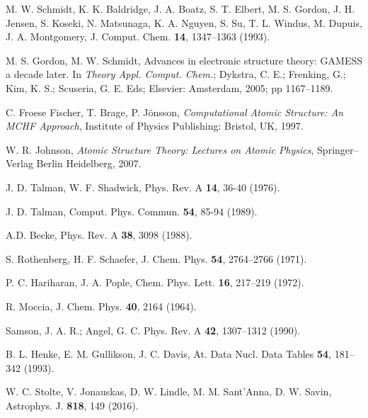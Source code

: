 \begin{thebibliography}{9}

M. W. Schmidt, K. K. Baldridge, J. A. Boatz, S. T. Elbert, M. S. Gordon, 
J. H. Jensen, S. Koseki, N. Matsunaga, K. A. Nguyen, S. Su, T. L. Windus, 
M. Dupuis, J. A. Montgomery, 
J. Comput. Chem. \textbf{14}, 1347--1363 (1993).

M. S. Gordon, M. W. Schmidt, 
Advances in electronic structure theory: GAMESS a decade later. 
In \textit{Theory Appl. Comput. Chem.}; 
Dykstra, C. E.; Frenking, G.; Kim, K. S.; Scuseria, G. E. Eds;
Elsevier: Amsterdam, 2005; pp 1167--1189.


C. Froese Fischer, T. Brage, P. J\"onsson,
\textit{Computational Atomic Structure: An MCHF Approach},
Institute of Physics Publishing: Bristol, UK, 1997.

W. R. Johnson, 
\textit{Atomic Structure Theory: Lectures on Atomic Physics},
Springer--Verlag Berlin Heidelberg, 2007.


J. D. Talman, W. F. Shadwick, 
Phys. Rev. A \textbf{14}, 36-40 (1976).

J. D. Talman, 
Comput. Phys. Commun. \textbf{54}, 85-94 (1989).


A.D. Becke, 
Phys. Rev. A \textbf{38}, 3098 (1988).


S. Rothenberg, H. F. Schaefer, 
J. Chem. Phys. \textbf{54}, 2764--2766 (1971).

P. C. Hariharan, J. A. Pople, 
Chem. Phys. Lett. \textbf{16}, 217--219 (1972).

R. Moccia, 
J. Chem. Phys. \textbf{40}, 2164 (1964).


Samson, J. A. R.; Angel, G. C.
Phys. Rev. A \textbf{42}, 1307--1312 (1990).

B. L. Henke, E. M. Gullikson, J. C. Davis, 
At. Data Nucl. Data Tables \textbf{54}, 181--342 (1993).

W. C. Stolte, V. Jonauskas, D. W. Lindle, M. M. Sant'Anna, D. W. Savin, 
Astrophys. J. \textbf{818}, 149 (2016).


\end{thebibliography}
